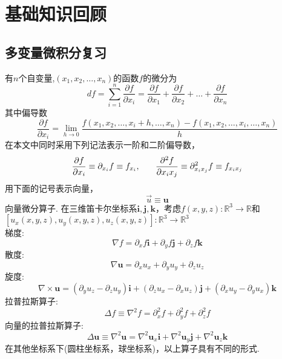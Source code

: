 \chapter{基础知识回顾}

\section{多变量微积分复习}
有$n$个自变量,$(x_1,x_2,\ldots,x_n)$的函数$f$的微分为
	\begin{equation}
		df = \sum_{i=1}^n \frac{\partial f}{\partial x_i} = \frac{\partial f}{\partial x_1} + \frac{\partial f}{\partial x_2} + \ldots + \frac{\partial f}{\partial x_n}
	\end{equation}
	其中偏导数
	\begin{equation}
		\frac{\partial f}{\partial x_i} = \lim_{h \to 0} \frac{f(x_1,x_2,\ldots,x_i + h, \ldots, x_n) - f(x_1,x_2,\ldots,x_i, \ldots, x_n)}{h}
	\end{equation}
	在本文中同时采用下列记法表示一阶和二阶偏导数，
	\begin{equation}
		\frac{\partial f}{\partial x_i} \equiv \partial_{x_i} f \equiv f_{x_i}, \hspace{0.25in}\frac{\partial^2 f}{\partial x_i x_j} \equiv \partial_{x_i x_j}^2 f \equiv f_{x_i x_j}
	\end{equation}
	用下面的记号表示向量，
	\begin{equation}
		\vec{u} \equiv \mathbf{u}
	\end{equation}
	向量微分算子. 在三维笛卡尔坐标系${\mathbf{i},\mathbf{j}, \mathbf{k} }$，考虑$f(x,y,z):\mathbb{R}^3\to \mathbb{R}$和$[u_x(x,y,z),u_y(x,y,z),u_z(x,y,z)]:\mathbb{R}^3\to \mathbb{R}^3$ \\
	梯度:
		\begin{equation}
			\nabla f = \partial_x f \mathbf{i}  + \partial_y f \mathbf{j} + \partial_z f \mathbf{k}
		\end{equation}
	散度:
	\begin{equation}
		\nabla \mathbf{u} = \partial_x u_x + \partial_y u_y + \partial_z u_z
	\end{equation}
	旋度:
	\begin{equation}
		\nabla \times \mathbf{u} = (\partial_y u_z - \partial_z u_y )\mathbf{i} + (\partial_z u_x - \partial_x u_z)\mathbf{j} + ( \partial_x u_y - \partial_y u_x )\mathbf{k}
	\end{equation}
	拉普拉斯算子:
	\begin{equation}
		\Delta f \equiv \nabla^2 f = \partial_x^2 f + \partial_y^2 f + \partial_z^2 f
	\end{equation}
	向量的拉普拉斯算子:
	\begin{equation}
	\Delta \mathbf{u} \equiv \nabla^2 \mathbf{u} = \nabla^2 \mathbf{u}_x\mathbf{i}  + \nabla^2 \mathbf{u}_y\mathbf{j} + \nabla^2 \mathbf{u}_z\mathbf{k}
	\end{equation}
	在其他坐标系下(圆柱坐标系，球坐标系)，以上算子具有不同的形式.
